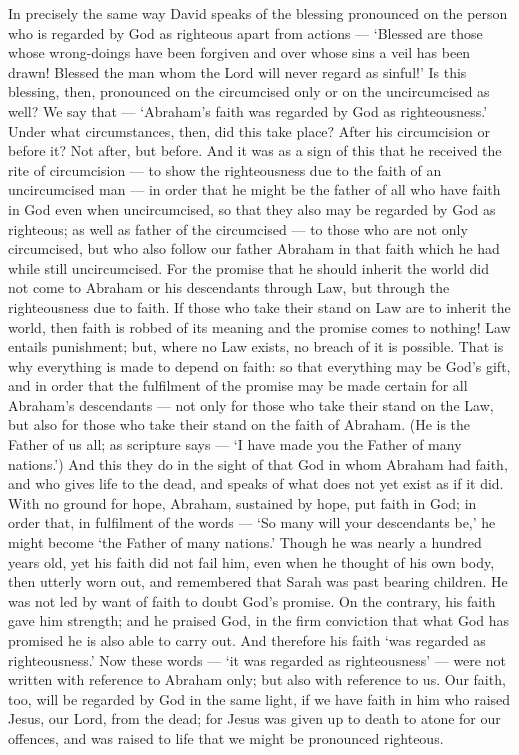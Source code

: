  In precisely the same way David speaks of the blessing
pronounced on the person who is regarded by God as righteous apart from
actions ---  `Blessed are those whose wrong-doings have been
forgiven and over whose sins a veil has been drawn!  Blessed
the man whom the Lord will never regard as sinful!'  Is this
blessing, then, pronounced on the circumcised only or on the
uncircumcised as well? We say that --- `Abraham's faith was regarded by
God as righteousness.'  Under what circumstances, then, did
this take place? After his circumcision or before it?  Not
after, but before. And it was as a sign of this that he received the
rite of circumcision --- to show the righteousness due to the faith of
an uncircumcised man --- in order that he might be the father of all who
have faith in God even when uncircumcised, so that they also may be
regarded by God as righteous;  as well as father of the
circumcised --- to those who are not only circumcised, but who also
follow our father Abraham in that faith which he had while still
uncircumcised.  For the promise that he should inherit the
world did not come to Abraham or his descendants through Law, but
through the righteousness due to faith.  If those who take
their stand on Law are to inherit the world, then faith is robbed of its
meaning and the promise comes to nothing!  Law entails
punishment; but, where no Law exists, no breach of it is possible.
 That is why everything is made to depend on faith: so that
everything may be God's gift, and in order that the fulfilment of the
promise may be made certain for all Abraham's descendants --- not only
for those who take their stand on the Law, but also for those who take
their stand on the faith of Abraham. (He is the Father of us all;
 as scripture says --- `I have made you the Father of many
nations.') And this they do in the sight of that God in whom Abraham had
faith, and who gives life to the dead, and speaks of what does not yet
exist as if it did.  With no ground for hope, Abraham,
sustained by hope, put faith in God; in order that, in fulfilment of the
words --- `So many will your descendants be,' he might become `the
Father of many nations.'  Though he was nearly a hundred
years old, yet his faith did not fail him, even when he thought of his
own body, then utterly worn out, and remembered that Sarah was past
bearing children.  He was not led by want of faith to doubt
God's promise.  On the contrary, his faith gave him
strength; and he praised God, in the firm conviction that what God has
promised he is also able to carry out.  And therefore his
faith `was regarded as righteousness.'  Now these words ---
`it was regarded as righteousness' --- were not written with reference
to Abraham only;  but also with reference to us. Our faith,
too, will be regarded by God in the same light, if we have faith in him
who raised Jesus, our Lord, from the dead;  for Jesus was
given up to death to atone for our offences, and was raised to life that
we might be pronounced righteous.

